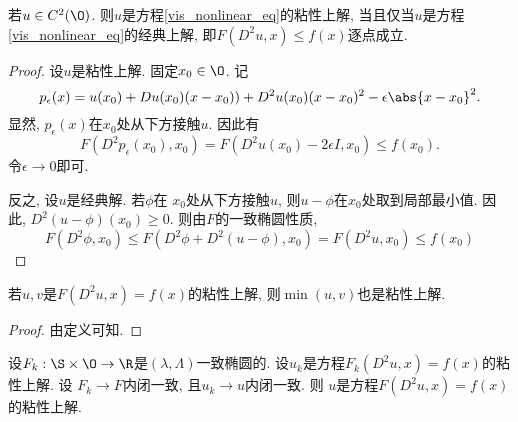 \begin{proposition}
    若$u \in C^2(\O)$.  则$u$是方程\eqref{vis_nonlinear_eq}的粘性上解, 当且仅当$u$是方程\eqref{vis_nonlinear_eq}的经典上解, 即$F(D^2u, x) \le f(x)$逐点成立.  
\end{proposition}
\begin{proof}
    设$u$是粘性上解.  固定$x_0\in \O$.  记
    \begin{equation}
        p_\epsilon(x)=u(x_0)+Du(x_0)(x-x_0))+D^2u(x_0)(x-x_0)^2-\epsilon\abs{x-x_0}^2.  
    \end{equation}
    显然, $p_\epsilon(x)$在$x_0$处从下方接触$u$.  因此有
    \begin{equation}
        F(D^2p_\epsilon(x_0), x_0)=F(D^2u(x_0)-2\epsilon I, x_0) \le f(x_0).  
    \end{equation}
    令$\epsilon\to 0$即可.  
    \par 反之, 设$u$是经典解.  若$\phi$在 $x_0$处从下方接触$u$, 则$u - \phi$在$x_0$处取到局部最小值.  因此, $D^2(u-\phi)(x_0) \ge 0$.  则由$F$的一致椭圆性质, 
    \begin{equation}
        F(D^2\phi, x_0) \le F(D^2\phi+D^2(u-\phi), x_0)=F(D^2u, x_0) \le f(x_0)
    \end{equation}
\end{proof}
\begin{proposition}
    若$u, v$是$F(D^2u, x)=f(x)$的粘性上解, 则$\min(u, v)$也是粘性上解.  
\end{proposition}
\begin{proof}
    由定义可知.  
\end{proof}
\begin{theorem}[粘性解的稳定性]
    设$F_k: \S \times \O \to \R$是$(\lambda, \Lambda)$一致椭圆的.  设$u_k$是方程$F_k(D^2u, x)=f(x)$的粘性上解.  设 $F_k \to F$内闭一致, 且$u_k \to u$内闭一致.  则 $u$是方程$F(D^2u, x)=f(x)$的粘性上解.  
\end{theorem}
